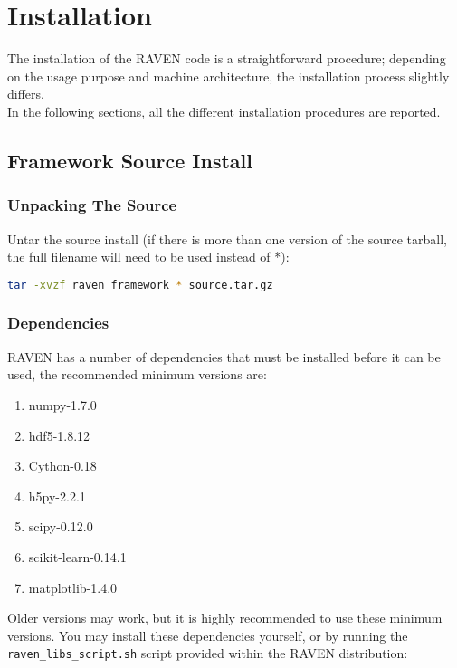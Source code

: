 \section{Installation}
The installation of the RAVEN code is a straightforward procedure; depending on the usage purpose 
and machine architecture, the installation process slightly differs. \\In the following sections, all the different
installation procedures are reported.

\subsection{Framework Source Install}

\subsubsection{Unpacking The Source}

Untar the source install (if there is more than one version of the
source tarball, the full filename will need to be used instead of *):

\begin{lstlisting}[language=bash]
tar -xvzf raven_framework_*_source.tar.gz
\end{lstlisting}

\subsubsection{Dependencies}
\label{raven_dependencies}
RAVEN has a number of dependencies that must be installed before it can be used,
the recommended minimum versions are:

\begin{enumerate}
\item numpy-1.7.0
\item hdf5-1.8.12
\item Cython-0.18
\item h5py-2.2.1
\item scipy-0.12.0
\item scikit-learn-0.14.1
\item matplotlib-1.4.0
\end{enumerate}

Older versions may work, but it is highly recommended to use these minimum 
versions.
%
You may install these dependencies yourself, or by running the
\texttt{raven\_libs\_script.sh} script provided within the RAVEN distribution:

